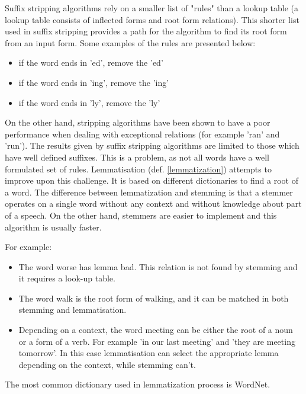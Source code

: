  \begin{definition}
 	\label{suffix}
Suffix stripping algorithms rely on a smaller list of "rules" than a lookup table (a lookup table consists of inflected forms and root form relations). This shorter list used in suffix stripping provides a path for the algorithm to find its root form from an input form. Some examples of the rules are presented below:
\begin{itemize}
	\item if the word ends in 'ed', remove the 'ed'
	\item if the word ends in 'ing', remove the 'ing'
	\item if the word ends in 'ly', remove the 'ly'\\
\end{itemize}
 \end{definition}


 On the other hand, stripping algorithms have been shown to have a poor performance when dealing with exceptional relations (for example 'ran' and 'run'). The results given by suffix stripping algorithms are limited to those which have well defined suffixes. This is a problem, as not all words have a well formulated set of rules. Lemmatisation (def. \ref{lemmatization}) attempts to improve upon this challenge.
It is based on different dictionaries to find a root of a word. The difference between lemmatization and stemming is that a stemmer operates on a single word without any context and without knowledge about part of a speech. On the other hand, stemmers are easier to implement and this algorithm is usually faster.

For example:
\begin{itemize}
	\item The word worse has lemma bad. This relation is not found by stemming and it requires a look-up table.
	\item The word walk is the root form of walking, and it can be matched in both stemming and lemmatisation.
	\item Depending on a context, the word meeting can be either the root of a noun or a form of a verb. For example 'in our last meeting' and 'they are meeting tomorrow'. In this case lemmatisation can select the appropriate lemma depending on the context, while stemming can't.
\end{itemize}

The most common dictionary used in lemmatization process is WordNet.\\

